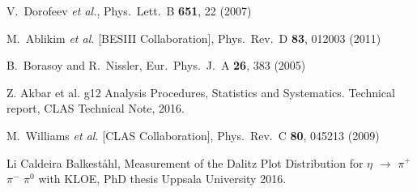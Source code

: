 \begin{thebibliography}{1}

  V.~Dorofeev {\it et al.},
   Phys.\ Lett.\ B {\bf 651}, 22 (2007)
   
M.~Ablikim {\it et al.} [BESIII Collaboration],
Phys.\ Rev.\ D {\bf 83}, 012003 (2011)
   
  B.~Borasoy and R.~Nissler,
  Eur.\ Phys.\ J.\ A {\bf 26}, 383 (2005)
     
 Z. Akbar et al. g12 Analysis Procedures, Statistics and Systematics. Technical report, CLAS Technical Note, 2016.

  M.~Williams {\it et al.} [CLAS Collaboration],
  Phys.\ Rev.\ C {\bf 80}, 045213 (2009)

Li Caldeira Balkeståhl, Measurement of the Dalitz Plot Distribution for $\eta$ $\rightarrow$ $\pi^{+}$ $\pi^{-}$ $\pi^{0}$ with KLOE, PhD thesis Uppsala University 2016. 

\end{thebibliography}